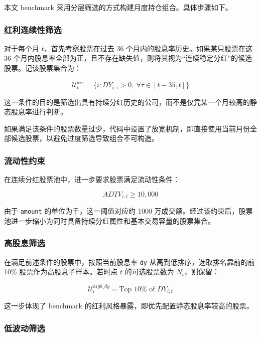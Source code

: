 \documentclass[a4paper,10pt]{article}
\begin{document}
本文 benchmark 采用分层筛选的方式构建月度持仓组合。具体步骤如下。

\subsubsection{红利连续性筛选}

对于每个月 $t$，首先考察股票在过去 36 个月内的股息率历史。如果某只股票在这 36 个月内股息率全部为正，且不存在缺失值，则将其视为“连续稳定分红”的候选股票。记该股票集合为：

\begin{equation}
\mathcal{U}_t^{div} = \{ i : DY_{i,\tau} > 0,\ \forall \tau \in [t-35, t] \}
\end{equation}

这一条件的目的是筛选出具有持续分红历史的公司，而不是仅凭某一个月较高的静态股息率进行判断。

如果满足该条件的股票数量过少，代码中设置了放宽机制，即直接使用当前月份全部候选股票，以避免过度筛选导致组合不可构造。

\subsubsection{流动性约束}

在连续分红股票池中，进一步要求股票满足流动性条件：

\begin{equation}
ADTV_{i,t} \geq 10{,}000
\end{equation}

由于 \texttt{amount} 的单位为千，这一阈值对应约 1000 万成交额。经过该约束后，股票池进一步缩小为同时具备持续分红属性和基本交易容量的股票集合。

\subsubsection{高股息筛选}

在满足前述条件的股票中，按照当前股息率 \texttt{dy} 从高到低排序，选取排名靠前的前 10\% 股票作为高股息子样本。若时点 $t$ 的可选股票数为 $N_t$，则保留：

\begin{equation}
\mathcal{U}_t^{high\_dy} = \text{Top } 10\% \text{ of } DY_{i,t}
\end{equation}

这一步体现了 benchmark 的红利风格暴露，即优先配置静态股息率较高的股票。

\subsubsection{低波动筛选}
\end{document}
